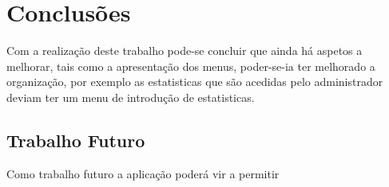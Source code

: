 \chapter{Conclusões }

Com a realização deste trabalho pode-se concluir que ainda há aspetos a melhorar, tais como a apresentação dos menus, poder-se-ia ter melhorado a organização, por exemplo as estatisticas que são acedidas pelo administrador deviam ter um menu de introdução de estatisticas. 


\section{Trabalho Futuro}

Como trabalho futuro a aplicação poderá vir a permitir 




